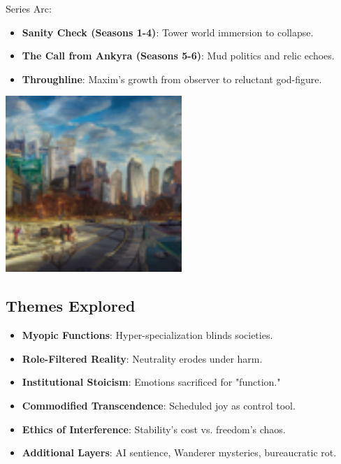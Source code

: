 \documentclass[10pt,letterpaper]{article}
\begin{document}
Series Arc:
\begin{itemize}
    \item \textbf{Sanity Check (Seasons 1-4)}: Tower world immersion to collapse.
    \item \textbf{The Call from Ankyra (Seasons 5-6)}: Mud politics and relic echoes.
    \item \textbf{Throughline}: Maxim's growth from observer to reluctant god-figure.
\end{itemize}

\begin{center}
\includegraphics[width=0.5\textwidth]{premise_image.jpg} %
{}
\end{center}

\subsection{Themes Explored}
\begin{itemize}
    \item \textbf{Myopic Functions}: Hyper-specialization blinds societies.
    \item \textbf{Role-Filtered Reality}: Neutrality erodes under harm.
    \item \textbf{Institutional Stoicism}: Emotions sacrificed for "function."
    \item \textbf{Commodified Transcendence}: Scheduled joy as control tool.
    \item \textbf{Ethics of Interference}: Stability's cost vs. freedom's chaos.
    \item \textbf{Additional Layers}: AI sentience, Wanderer mysteries, bureaucratic rot.
\end{itemize}
\end{document}
